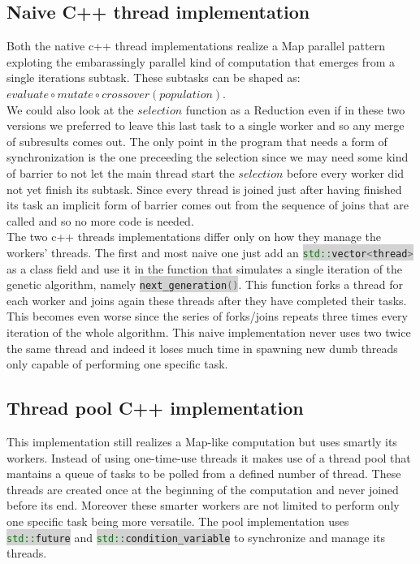 \documentclass[11pt]{article}
\newcommand{\inlinecode}[2]{\colorbox{lightgray}{\lstinline[language=#1]$#2$}}
\begin{document}
\subsection{Naive C++ thread implementation}
Both the native c++ thread implementations realize a Map parallel pattern exploting the embarassingly parallel kind of computation that emerges from a single iterations subtask. These subtasks can be shaped as: $  evaluate \circ mutate \circ crossover (population) $. \\
We could also look at the $ selection $ function as a Reduction even if in these two versions we preferred to leave this last task to a single worker and so any merge of subresults comes out. The only point in the program that needs a form of synchronization is the one preceeding the selection since we may need some kind of barrier to not let the main thread start the $ selection $ before every worker did not yet finish its subtask. Since every thread is joined just after having finished its task an implicit form of barrier comes out from the sequence of joins that are called and so no more code is needed.\\
The two c++ threads implementations differ only on how they manage the workers' threads. 
The first and most naive one just add an \inlinecode{C++}{std::vector<thread>} as a class field and use it in the function that simulates a single iteration of the genetic algorithm, namely \inlinecode{C++}{next_generation()}. This function forks a thread for each worker and joins again these threads after they have completed their tasks. This becomes even worse since the series of forks/joins repeats three times every iteration of the whole algorithm. This naive implementation never uses two twice the same thread and indeed it loses much time in spawning new dumb threads only capable of performing one specific task.

\subsection{Thread pool C++ implementation}
This implementation still realizes a Map-like computation but uses smartly its workers. Instead of using one-time-use threads it makes use of a thread pool that mantains a queue of tasks to be polled from a defined number of thread. These threads are created once at the beginning of the computation and never joined before its end. Moreover these smarter workers are not limited to perform only one specific task being more versatile. The pool implementation uses \inlinecode{C++}{std::future} and \inlinecode{C++}{std::condition_variable} to synchronize and manage its threads.
\end{document}
